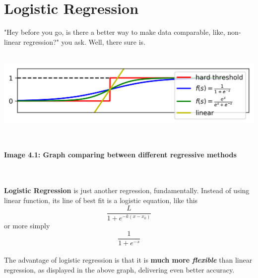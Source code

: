 \documentclass{article}
\begin{document}
	\section{Logistic Regression}
	"Hey before you go, is there a better way to make data comparable, like, non-linear regression?" you ask. Well, there sure is.\\\\
\centerline{\includegraphics[scale=0.7]{img6}}\\
\centerline{\small{\textbf{ Image 4.1: Graph comparing between different regressive methods}}}\\\\ 
\tab\tab \textbf{Logistic Regression} is just another regression, fundamentally. Instead of using linear function, its line of best fit is a logistic equation, like this $$\frac{L}{1 + e^{-k(x-x_0)}}$$
\tab or more simply $$\frac{1}{1 + e^{-s}}$$\\
\tab\tab The advantage of logistic regression is that it is \textbf{much more \textit{flexible}} than linear regression, as displayed in the above graph, delivering even better accuracy.
\end{document}
